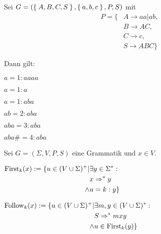 \begin{beispiel}[$k$-Anfang]
    Sei $G = (\Set{A, B, C, S}, \Set{a, b, c}, P, S)$ mit
    \begin{align*}
        P = \{ &A \rightarrow aa | ab, \\
               &B \rightarrow AC,\\
               &C \rightarrow c,\\
               &S \rightarrow ABC\}
    \end{align*}

    Dann gilt:
    \begin{bspenum}
        \item $a = 1 : aaaa$
        \item $a = 1 : a$
        \item $a = 1 : aba$
        \item $ab = 2 : aba$
        \item $aba = 3 : aba$
        \item $aba\# = 4 : aba$
    \end{bspenum}
\end{beispiel}

\begin{definition}%
    Sei $G = (\Sigma, V, P, S)$ eine Grammatik und $x \in V$.

    \begin{defenum}
        \item $\begin{aligned}[t]\operatorname{First}_k (x) := \{u \in (V \cup \Sigma)^+ | &\exists y \in \Sigma^*:\\
              &x \Rightarrow^* y\\
        \land &u = k : y \}\end{aligned}$
        \item $\begin{aligned}[t]\operatorname{Follow}_k(x) := \{u \in (V \cup \Sigma)^+ | &\exists m, y \in (V \cup \Sigma)^* :\\
              &S \Rightarrow^* mxy\\
        \land &u \in \operatorname{First}_k(y)\}\end{aligned}$
    \end{defenum}
\end{definition}

